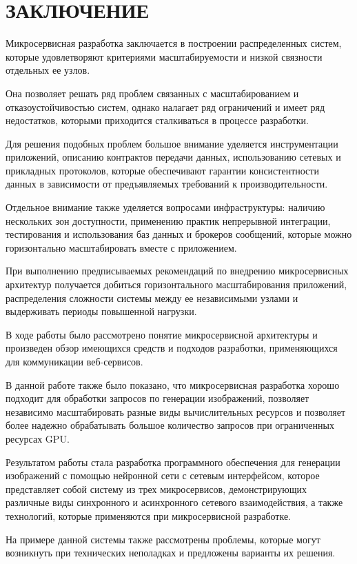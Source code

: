 \chapter*{ \large ЗАКЛЮЧЕНИЕ}

Микросервисная разработка заключается в построении распределенных систем, которые удовлетворяют
критериями масштабируемости и низкой связности отдельных ее узлов.

Она позволяет решать ряд проблем связанных с масштабированием и отказоустойчивостью систем, 
однако налагает ряд ограничений и имеет ряд недостатков, 
которыми приходится сталкиваться в процессе разработки.

Для решения подобных проблем большое внимание уделяется инструментации приложений, описанию контрактов
передачи данных, использованию сетевых и прикладных протоколов, которые обеспечивают гарантии
консистентности данных в зависимости от предъявляемых требований к производительности.

Отдельное внимание также уделяется вопросами инфраструктуры: наличию нескольких зон доступности, 
применению практик непрерывной интеграции, тестирования и использования баз данных и брокеров сообщений,
которые можно горизонтально масштабировать вместе с приложением.

При выполнению предписываемых рекомендаций по внедрению микросервисных архитектур получается
добиться горизонтального масштабирования приложений, распределения сложности системы 
между ее независимыми узлами и выдерживать периоды повышенной нагрузки.

В ходе работы было рассмотрено понятие микросервисной архитектуры и произведен обзор имеющихся средств и подходов разработки,
применяющихся для коммуникации веб-сервисов.

В данной работе также было показано, что микросервисная разработка хорошо подходит для обработки запросов
по генерации изображений, позволяет независимо масштабировать разные виды вычислительных ресурсов и 
позволяет более надежно обрабатывать большое количество запросов при ограниченных ресурсах GPU.

Результатом работы стала разработка программного обеспечения для генерации изображений
с помощью нейронной сети с сетевым интерфейсом, которое представляет собой систему из трех микросервисов,
демонстрирующих различные виды синхронного и асинхронного сетевого взаимодействия, а также технологий,
которые применяются при микросервисной разработке. 

На примере данной системы также рассмотрены проблемы, которые могут возникнуть при технических неполадках
и предложены варианты их решения.

